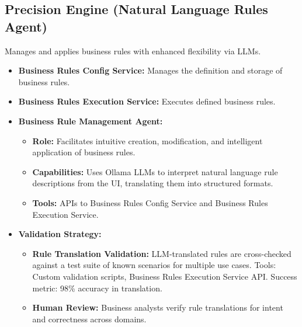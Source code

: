 \documentclass{article}
\begin{document}
\subsection{Precision Engine (Natural Language Rules Agent)}
Manages and applies business rules with enhanced flexibility via LLMs.
\begin{itemize}
    \item \textbf{Business Rules Config Service:} Manages the definition and storage of business rules.
    \item \textbf{Business Rules Execution Service:} Executes defined business rules.
    \item \textbf{Business Rule Management Agent:}
        \begin{itemize}
            \item \textbf{Role:} Facilitates intuitive creation, modification, and intelligent application of business rules.
            \item \textbf{Capabilities:} Uses Ollama LLMs to interpret natural language rule descriptions from the UI, translating them into structured formats.
            \item \textbf{Tools:} APIs to Business Rules Config Service and Business Rules Execution Service.
        \end{itemize}
    \item \textbf{Validation Strategy:}
        \begin{itemize}
            \item \textbf{Rule Translation Validation:} LLM-translated rules are cross-checked against a test suite of known scenarios for multiple use cases. Tools: Custom validation scripts, Business Rules Execution Service API. Success metric: 98\% accuracy in translation.
            \item \textbf{Human Review:} Business analysts verify rule translations for intent and correctness across domains.
        \end{itemize}
\end{itemize}
\end{document}
